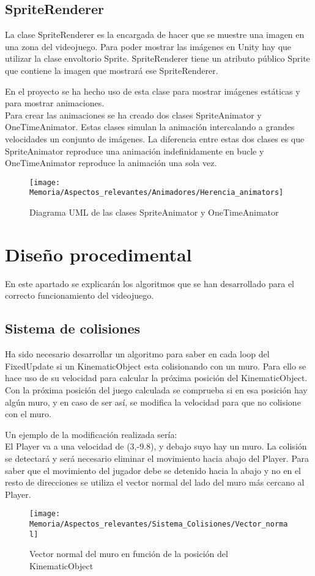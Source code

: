 \subsection{SpriteRenderer}
La clase SpriteRenderer es la encargada de hacer que se muestre una imagen en una zona del videojuego. Para poder mostrar las imágenes en Unity hay que utilizar la clase envoltorio Sprite. SpriteRenderer tiene un atributo público Sprite que contiene la imagen que mostrará ese SpriteRenderer.

En el proyecto se ha hecho uso de esta clase para mostrar imágenes estáticas y para mostrar animaciones.\\
Para crear las animaciones se ha creado dos clases SpriteAnimator y OneTimeAnimator. Estas clases simulan la animación intercalando a grandes velocidades un conjunto de imágenes. La diferencia entre estas dos clases es que SpriteAnimator reproduce una animación indefinidamente en bucle y OneTimeAnimator reproduce la animación una sola vez.

\begin{figure}[h]
\texttt{[image: Memoria/Aspectos\_relevantes/Animadores/Herencia\_animators]}
\caption{Diagrama UML de las clases SpriteAnimator y OneTimeAnimator}
\end{figure}

\section{Diseño procedimental}
En este apartado se explicarán los algoritmos que se han desarrollado para el correcto funcionamiento del videojuego.

\subsection{Sistema de colisiones}
Ha sido necesario desarrollar un algoritmo para saber en cada loop del FixedUpdate si un KinematicObject esta colisionando con un muro. Para ello se hace uso de su velocidad para calcular la próxima posición del KinematicObject.\\
Con la próxima posición del juego calculada se comprueba si en esa posición hay algún muro, y en caso de ser así, se modifica la velocidad para que no colisione con el muro.

Un ejemplo de la modificación realizada sería:\\
El Player va a una velocidad de (3,-9.8), y debajo suyo hay un muro. La colisión se detectará y será necesario eliminar el movimiento hacia abajo del Player. Para saber que el movimiento del jugador debe se detenido hacia la abajo y no en el resto de direcciones se utiliza el vector normal del lado del muro más cercano al Player.
\begin{figure}[h]
\centering
\texttt{[image: Memoria/Aspectos\_relevantes/Sistema\_Colisiones/Vector\_normal]}
\caption{Vector normal del muro en función de la posición del KinematicObject}
\end{figure}

